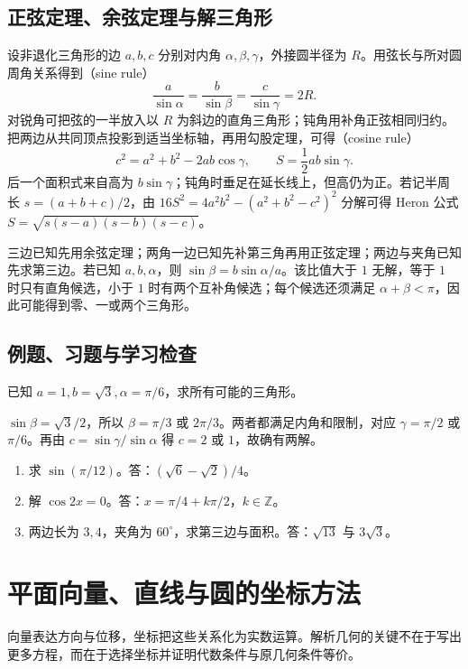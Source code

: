\documentclass[UTF8]{ctexbook}
\begin{document}
\section{正弦定理、余弦定理与解三角形}
设非退化三角形的边 $a,b,c$ 分别对内角 $\alpha,\beta,\gamma$，外接圆半径为 $R$。用弦长与所对圆周角关系得到（sine rule）
\[
 \frac a{\sin\alpha}=\frac b{\sin\beta}=\frac c{\sin\gamma}=2R.
\]
对锐角可把弦的一半放入以 $R$ 为斜边的直角三角形；钝角用补角正弦相同归约。把两边从共同顶点投影到适当坐标轴，再用勾股定理，可得（cosine rule）
\begin{equation}\label{eq:em-cosine-rule}
 c^2=a^2+b^2-2ab\cos\gamma,\qquad
 S=\frac12ab\sin\gamma.
\end{equation}
后一个面积式来自高为 $b\sin\gamma$；钝角时垂足在延长线上，但高仍为正。若记半周长 $s=(a+b+c)/2$，由 $16S^2=4a^2b^2-(a^2+b^2-c^2)^2$ 分解可得 Heron 公式 $S=\sqrt{s(s-a)(s-b)(s-c)}$。

三边已知先用余弦定理；两角一边已知先补第三角再用正弦定理；两边与夹角已知先求第三边。若已知 $a,b,\alpha$，则 $\sin\beta=b\sin\alpha/a$。该比值大于 $1$ 无解，等于 $1$ 时只有直角候选，小于 $1$ 时有两个互补角候选；每个候选还须满足 $\alpha+\beta<\pi$，因此可能得到零、一或两个三角形。

\section{例题、习题与学习检查}
\begin{example}
已知 $a=1,b=\sqrt3,\alpha=\pi/6$，求所有可能的三角形。
\end{example}
\begin{solve}
$\sin\beta=\sqrt3/2$，所以 $\beta=\pi/3$ 或 $2\pi/3$。两者都满足内角和限制，对应 $\gamma=\pi/2$ 或 $\pi/6$。再由 $c=\sin\gamma/\sin\alpha$ 得 $c=2$ 或 $1$，故确有两解。
\end{solve}
\begin{enumerate}
\item 求 $\sin(\pi/12)$。答：$(\sqrt6-\sqrt2)/4$。
\item 解 $\cos2x=0$。答：$x=\pi/4+k\pi/2$，$k\in\mathbb Z$。
\item 两边长为 $3,4$，夹角为 $60^\circ$，求第三边与面积。答：$\sqrt{13}$ 与 $3\sqrt3$。
\end{enumerate}

\chapter{平面向量、直线与圆的坐标方法}
\label{chap:em-vectors}
向量表达方向与位移，坐标把这些关系化为实数运算。解析几何的关键不在于写出更多方程，而在于选择坐标并证明代数条件与原几何条件等价。
\end{document}
